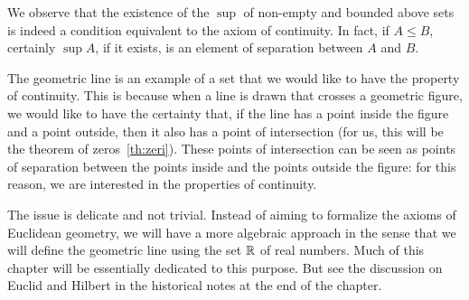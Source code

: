 We observe that the existence of the $\sup$
of non-empty and bounded above sets
is indeed a condition equivalent to the axiom of continuity.
In fact, if $A\le B$, certainly $\sup A$, if it exists, is an element 
of separation between $A$ and $B$.

The geometric line is an example of a set that 
we would like to have the property of continuity.
This is because when a line is drawn that crosses a geometric figure, 
we would like to have the certainty that, 
if the line has a point inside the figure and a point outside, 
then it also has a point of intersection (for us, this will be the theorem 
of zeros~\ref{th:zeri}).
These points of intersection can be  
seen as points of separation between the points
inside and the points outside the figure:
for this reason, we are interested in the properties of continuity.

The issue is delicate and not trivial. 
Instead of aiming to formalize the axioms of Euclidean geometry,
we will have a more algebraic approach in the sense that we will define 
the geometric line using the set ${\mathbb R}$ of real numbers.
Much of this chapter will be essentially dedicated to this purpose.
But see the discussion on Euclid and Hilbert in the historical notes 
at the end of the chapter.